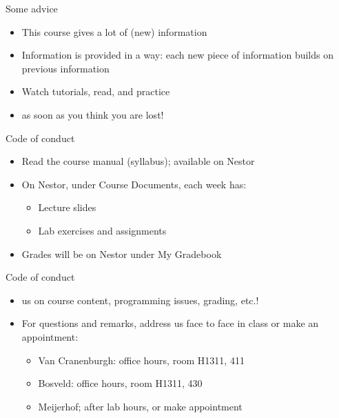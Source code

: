 \documentclass[aspectratio=169,usenames,dvipsnames]{beamer}
\begin{document}
\begin{frame}{Some advice}
    \begin{itemize}
        \item This course gives a lot of (new) information
        \item Information is provided in a  way:
            each new piece of information builds on previous information
        \item Watch tutorials, read, and practice
        \item {} as soon as you think you are lost!
    \end{itemize}
\end{frame}

\begin{frame}{Code of conduct}
    \begin{itemize}
        \item Read the course manual (syllabus); available on Nestor
        \item On Nestor, under Course Documents, each week has:
            \begin{itemize}
                \item Lecture slides
                \item Lab exercises and assignments
            \end{itemize}
        \item Grades will be on Nestor under My Gradebook
    \end{itemize}
\end{frame}

\begin{frame}{Code of conduct}
    \begin{itemize}
        \item {} us on course content,
            programming issues, grading, etc.!
        \item For questions and remarks, address us face to face in class
            or make an appointment:
            \begin{itemize}
                \item Van Cranenburgh: office hours, room H1311, 411
                \item Bosveld: office hours, room H1311, 430
                \item Meijerhof; after lab hours, or make appointment
            \end{itemize}
    \end{itemize}
\end{frame}
\end{document}
